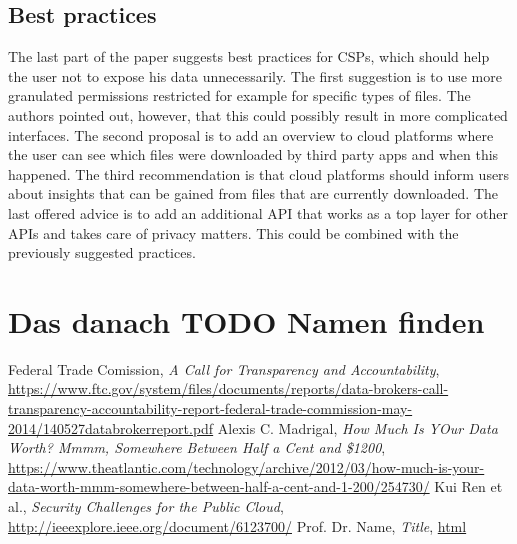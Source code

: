 \documentclass[11pt,twocolumn,a4paper,DIV=calc]{scrartcl}
\begin{document}
\subsection{Best practices}

The last part of the paper suggests best practices for CSPs, which should help the user not to expose his data unnecessarily. 
The first suggestion is to use more granulated permissions restricted for example for specific types of files. 
The authors pointed out, however, that this could possibly result in more complicated interfaces. 
The second proposal is to add an overview to cloud platforms where the user can see which files were downloaded by third party apps and when this happened. 
The third recommendation is that cloud platforms should inform users about insights that can be gained from files that are currently downloaded. 
The last offered advice is to add an additional API that works as a top layer for other APIs and takes care of privacy matters. This could be combined with the previously suggested practices.
\section{Das danach TODO Namen finden}
\begin{thebibliography}{99}
  Federal Trade Comission, \emph{A Call for Transparency and Accountability}, \url{https://www.ftc.gov/system/files/documents/reports/data-brokers-call-transparency-accountability-report-federal-trade-commission-may-2014/140527databrokerreport.pdf}
  Alexis C. Madrigal, \emph{How Much Is YOur Data Worth? Mmmm, Somewhere Between Half a Cent and \$1200}, \url{https://www.theatlantic.com/technology/archive/2012/03/how-much-is-your-data-worth-mmm-somewhere-between-half-a-cent-and-1-200/254730/}
  Kui Ren et al., \emph{Security Challenges for the Public Cloud}, \url{http://ieeexplore.ieee.org/document/6123700/}
  Prof. Dr. Name, \emph{Title}, \url{html}
\end{thebibliography}
\end{document}

